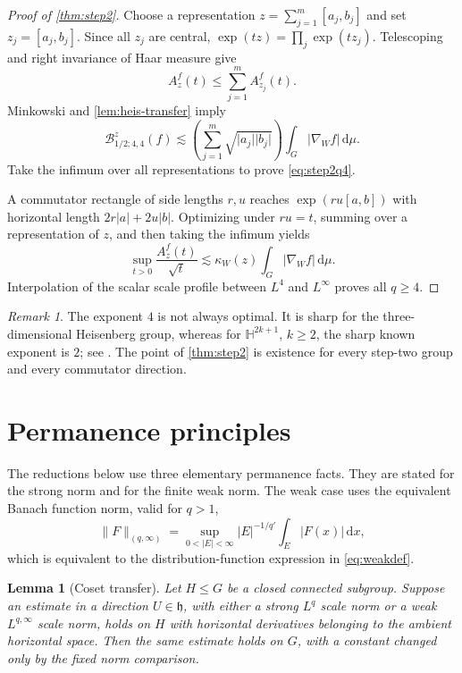 \documentclass[11pt]{article}
\newtheorem{lemma}[theorem]{Lemma}
\theoremstyle{definition}
\theoremstyle{remark}
\newtheorem{remark}[theorem]{Remark}
\newcommand{\h}{\mathfrak h}
\newcommand{\dd}{\,\mathrm d}
\newcommand{\abs}[1]{\lvert #1\rvert}
\newcommand{\norm}[1]{\lVert #1\rVert}
\newcommand{\A}[2]{A_{#1}^{#2}}
\newcommand{\B}[4]{\mathcal B^{#1}_{#2;#3,#4}}
\newcommand{\less}{\lesssim}
\begin{document}
\begin{proof}[Proof of \cref{thm:step2}]
Choose a representation \(z=\sum_{j=1}^m[a_j,b_j]\) and set
\(z_j=[a_j,b_j]\).  Since all \(z_j\) are central,
\(\exp(tz)=\prod_j\exp(tz_j)\).  Telescoping and right invariance of Haar measure give
\[
 \A{z}{f}(t)\le\sum_{j=1}^m\A{z_j}{f}(t).
\]
Minkowski and \cref{lem:heis-transfer} imply
\[
 \B{z}{1/2}{4}{4}(f)
 \less\left(\sum_{j=1}^m\sqrt{\abs{a_j}\abs{b_j}}\right)
 \int_G\abs{\nabla_Wf}\dd\mu.
\]
Take the infimum over all representations to prove \eqref{eq:step2q4}.

A commutator rectangle of side lengths \(r,u\) reaches
\(\exp(ru[a,b])\) with horizontal length \(2r\abs a+2u\abs b\).  Optimizing under
\(ru=t\), summing over a representation of \(z\), and then taking the infimum yields
\[
 \sup_{t>0}\frac{\A{z}{f}(t)}{\sqrt t}
 \less\kappa_W(z)\int_G\abs{\nabla_Wf}\dd\mu.
\]
Interpolation of the scalar scale profile between \(L^4\) and \(L^\infty\) proves all
\(q\ge4\).
\end{proof}

\begin{remark}
The exponent \(4\) is not always optimal.  It is sharp for the three-dimensional
Heisenberg group, whereas for \(\mathbb H^{2k+1}\), \(k\ge2\), the sharp known exponent is
\(2\); see \cite{NaorYoung2018,NaorYoung2022}.  The point of \cref{thm:step2} is
existence for every step-two group and every commutator direction.
\end{remark}

\section{Permanence principles}\label{sec:permanence}

The reductions below use three elementary permanence facts.  They are stated for the
strong norm and for the finite weak norm.  The weak case uses the equivalent Banach
function norm, valid for \(q>1\),
\begin{equation}\label{eq:weak-equivalent}
 \norm{F}_{(q,\infty)}=
 \sup_{0<\abs E<\infty}\abs E^{-1/q'}\int_E\abs{F(x)}\dd x,
\end{equation}
which is equivalent to the distribution-function expression in \eqref{eq:weakdef}.

\begin{lemma}[Coset transfer]\label{lem:coset}
Let \(H\le G\) be a closed connected subgroup.  Suppose an estimate in a direction
\(U\in\h\), with either a strong \(L^q\) scale norm or a weak \(L^{q,\infty}\) scale norm,
holds on \(H\) with horizontal derivatives belonging to the ambient horizontal space.
Then the same estimate holds on \(G\), with a constant changed only by the fixed norm
comparison.
\end{lemma}
\end{document}
